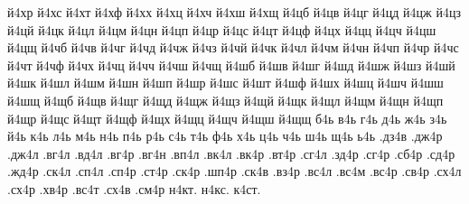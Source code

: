 {й4хр
й4хс
й4хт
й4хф
й4хх
й4хц
й4хч
й4хш
й4хщ
й4цб
й4цв
й4цг
й4цд
й4цж
й4цз
й4цй
й4цк
й4цл
й4цм
й4цн
й4цп
й4цр
й4цс
й4цт
й4цф
й4цх
й4цц
й4цч
й4цш
й4цщ
й4чб
й4чв
й4чг
й4чд
й4чж
й4чз
й4чй
й4чк
й4чл
й4чм
й4чн
й4чп
й4чр
й4чс
й4чт
й4чф
й4чх
й4чц
й4чч
й4чш
й4чщ
й4шб
й4шв
й4шг
й4шд
й4шж
й4шз
й4шй
й4шк
й4шл
й4шм
й4шн
й4шп
й4шр
й4шс
й4шт
й4шф
й4шх
й4шц
й4шч
й4шш
й4шщ
й4щб
й4щв
й4щг
й4щд
й4щж
й4щз
й4щй
й4щк
й4щл
й4щм
й4щн
й4щп
й4щр
й4щс
й4щт
й4щф
й4щх
й4щц
й4щч
й4щш
й4щщ
б4ь
в4ь
г4ь
д4ь
ж4ь
з4ь
й4ь
к4ь
л4ь
м4ь
н4ь
п4ь
р4ь
с4ь
т4ь
ф4ь
х4ь
ц4ь
ч4ь
ш4ь
щ4ь
ь4ь
.дз4в
.дж4р
.дж4л
.вг4л
.вд4л
.вг4р
.вг4н
.вп4л
.вк4л
.вк4р
.вт4р
.сг4л
.зд4р
.сг4р
.сб4р
.сд4р
.жд4р
.ск4л
.сп4л
.сп4р
.ст4р
.ск4р
.шп4р
.ск4в
.вз4р
.вс4л
.вс4м
.вс4р
.св4р
.сх4л
.сх4р
.хв4р
.вс4т
.сх4в
.см4р
н4кт.
н4кс.
к4ст.
}

